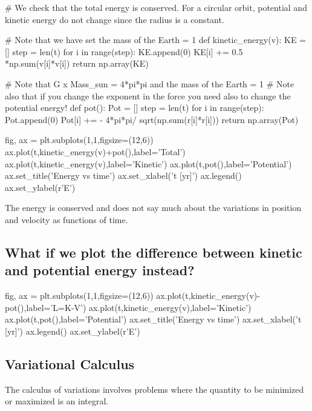 \documentclass[%
oneside,                 %
final,                   %
10pt]{article}
\begin{document}
# We check that the total energy is conserved. For a circular orbit, potential and kinetic energy do not change since the radius is a constant. 

# Note that we have set the mass of the Earth = 1
def kinetic_energy(v):
    KE = []
    step = len(t)
    for i in range(step):
        KE.append(0)
        KE[i] += 0.5 *np.sum(v[i]*v[i])
    return np.array(KE)


# Note that G x Mass_sun = 4*pi*pi and the mass of the Earth = 1
# Note also that if you change the exponent in the force you need also to change the potential energy!
def pot():
    Pot = []
    step = len(t)
    for i in range(step):
        Pot.append(0)
        Pot[i] +=  - 4*pi*pi/ sqrt(np.sum(r[i]*r[i]))
    return np.array(Pot)

fig, ax = plt.subplots(1,1,figsize=(12,6))
ax.plot(t,kinetic_energy(v)+pot(),label='Total')
ax.plot(t,kinetic_energy(v),label='Kinetic')
ax.plot(t,pot(),label='Potential')
ax.set_title('Energy vs time')
ax.set_xlabel('t [yr]')
ax.legend()
ax.set_ylabel(r'E')




\epycod


The energy is conserved and does not say much about the variations in position and velocity as functions of time.

\subsection{What if we plot the difference between kinetic and potential energy instead?}










\bpycod
fig, ax = plt.subplots(1,1,figsize=(12,6))
ax.plot(t,kinetic_energy(v)-pot(),label='L=K-V')
ax.plot(t,kinetic_energy(v),label='Kinetic')
ax.plot(t,pot(),label='Potential')
ax.set_title('Energy vs time')
ax.set_xlabel('t [yr]')
ax.legend()
ax.set_ylabel(r'E')

\epycod


\subsection{Variational Calculus}

The calculus of variations involves 
problems where the quantity to be minimized or maximized is an integral. 
\end{document}
